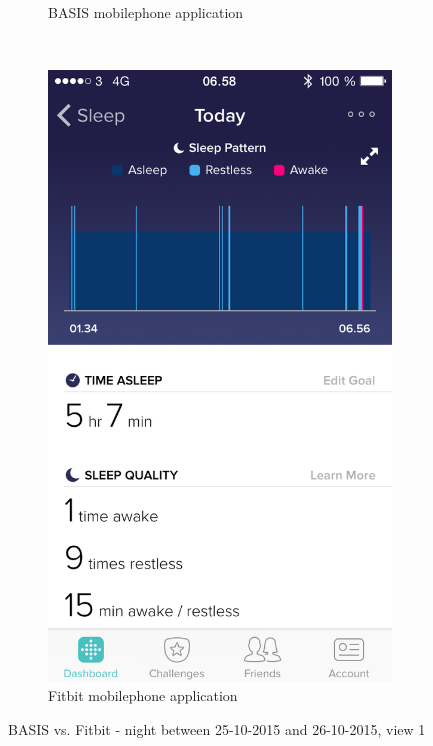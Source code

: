 \documentclass[12pt]{article} %
\begin{document}
\begin{figure}[H]
\begin{subfigure}[b]{0.45\textwidth}
        \caption{BASIS mobilephone application}
        \label{fig:basis1}
    \end{subfigure}
    ~ %
    \begin{subfigure}[b]{0.45\textwidth}
        \includegraphics[width=\textwidth]{26-10-fitbit}
        \caption{Fitbit mobilephone application}
        \label{fig:fitbit1}
    \end{subfigure}
    \caption{BASIS vs. Fitbit - night between 25-10-2015 and 26-10-2015, view 1}
    \label{fig:pilot1}
\end{figure}
\end{document}
